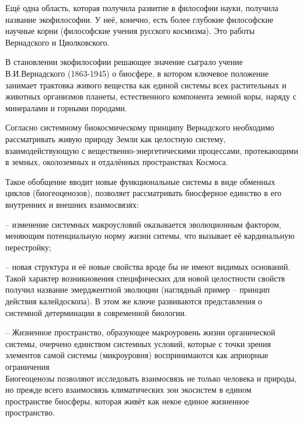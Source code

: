 \documentclass[exam_answers.tex]{subfiles}
\begin{document}
\renewcommand{\baselinestretch}{\blch}

Ещё одна область, которая получила развитие в философии науки, получила название экофилософии.
У неё, конечно, есть более глубокие философские научные корни (философские учения русского космизма).
Это работы Вернадского и Циолковского.

В становлении экофилософии решающее значение сыграло учение В.И.Вернадского (1863-1945) о биосфере, в котором ключевое положение занимает трактовка живого вещества как единой системы всех растительных и животных организмов планеты, естественного компонента земной коры, наряду с минералами и горными породами.

Согласно системному биокосмическому принципу Вернадского необходимо рассматривать живую природу Земли как целостную систему, взаимодействующую с вещественно-энергетическими процессами, протекающими в земных, околоземных и отдалённых пространствах Космоса.

Такое обобщение вводит новые функциональные системы в виде обменных циклов (биогеоценозов), позволяет рассматривать биосферное единство в его внутренних и внешних взаимосвязях:

-- изменение системных макроусловий оказывается эволюционным фактором, меняющим потенциальную норму жизни ситемы, что вызывает её кардинальную перестройку;

-- новая структура и её новые свойства вроде бы не имеют видимых оснований.
Такой характер возникновения специфических для новой целостности свойств получил название эмерджентной эволюции (наглядный пример – принцип действия калейдоскопа).
В этом же ключе развиваются представления о системной детерминации в современной биологии.

-- Жизненное пространство, образующее макроуровень жизни органической системы, очерчено единством системных условий, которые с точки зрения элементов самой системы (микроуровня) воспринимаются как априорные ограничения
\\

Биогеоценозы позволяют исследовать взаимосвязь не только человека и природы, но прежде всего взаимосвязь климатических зон экосистем в едином пространстве биосферы, которая живёт как некое единое жизненное пространство.
\end{document}
